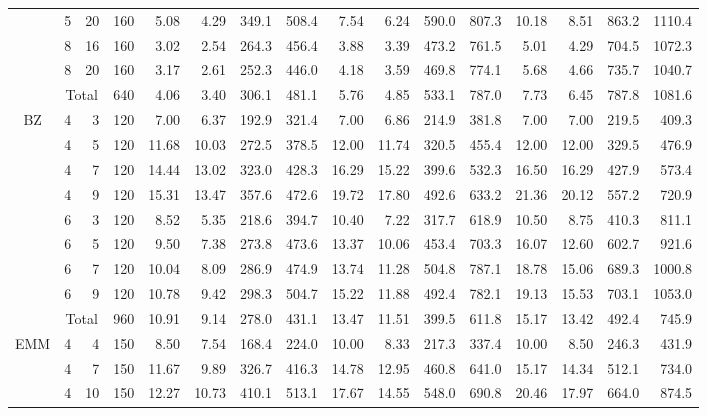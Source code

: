 \begin{table}[p]
{\begin{tabular}{@{} c r r r @{\hspace{\bbGroupSep}} *{4}{r} @{\hspace{\bbGroupSep}} *{4}{r} @{\hspace{\bbGroupSep}} *{4}{r} @{}}
     & 5 & 20 & 160 & 5.08 & 4.29 & 349.1 & 508.4 & 7.54 & 6.24 & 590.0 & 807.3 & 10.18 & 8.51 & 863.2 & 1110.4 \\
     & 8 & 16 & 160 & 3.02 & 2.54 & 264.3 & 456.4 & 3.88 & 3.39 & 473.2 & 761.5 & 5.01 & 4.29 & 704.5 & 1072.3 \\
     & 8 & 20 & 160 & 3.17 & 2.61 & 252.3 & 446.0 & 4.18 & 3.59 & 469.8 & 774.1 & 5.68 & 4.66 & 735.7 & 1040.7 \\
    \cmidrule{2-16}
     & \multicolumn{2}{c}{Total} & 640 & 4.06 & 3.40 & 306.1 & 481.1 & 5.76 & 4.85 & 533.1 & 787.0 & 7.73 & 6.45 & 787.8 & 1081.6 \\
    \cmidrule{1-16}
    \multirow{9}{*}{BZ} & 4 & 3 & 120 & 7.00 & 6.37 & 192.9 & 321.4 & 7.00 & 6.86 & 214.9 & 381.8 & 7.00 & 7.00 & 219.5 & 409.3 \\
     & 4 & 5 & 120 & 11.68 & 10.03 & 272.5 & 378.5 & 12.00 & 11.74 & 320.5 & 455.4 & 12.00 & 12.00 & 329.5 & 476.9 \\
     & 4 & 7 & 120 & 14.44 & 13.02 & 323.0 & 428.3 & 16.29 & 15.22 & 399.6 & 532.3 & 16.50 & 16.29 & 427.9 & 573.4 \\
     & 4 & 9 & 120 & 15.31 & 13.47 & 357.6 & 472.6 & 19.72 & 17.80 & 492.6 & 633.2 & 21.36 & 20.12 & 557.2 & 720.9 \\
     & 6 & 3 & 120 & 8.52 & 5.35 & 218.6 & 394.7 & 10.40 & 7.22 & 317.7 & 618.9 & 10.50 & 8.75 & 410.3 & 811.1 \\
     & 6 & 5 & 120 & 9.50 & 7.38 & 273.8 & 473.6 & 13.37 & 10.06 & 453.4 & 703.3 & 16.07 & 12.60 & 602.7 & 921.6 \\
     & 6 & 7 & 120 & 10.04 & 8.09 & 286.9 & 474.9 & 13.74 & 11.28 & 504.8 & 787.1 & 18.78 & 15.06 & 689.3 & 1000.8 \\
     & 6 & 9 & 120 & 10.78 & 9.42 & 298.3 & 504.7 & 15.22 & 11.88 & 492.4 & 782.1 & 19.13 & 15.53 & 703.1 & 1053.0 \\
    \cmidrule{2-16}
     & \multicolumn{2}{c}{Total} & 960 & 10.91 & 9.14 & 278.0 & 431.1 & 13.47 & 11.51 & 399.5 & 611.8 & 15.17 & 13.42 & 492.4 & 745.9 \\
    \cmidrule{1-16}
    \multirow{4}{*}{EMM} & 4 & 4 & 150 & 8.50 & 7.54 & 168.4 & 224.0 & 10.00 & 8.33 & 217.3 & 337.4 & 10.00 & 8.50 & 246.3 & 431.9 \\
     & 4 & 7 & 150 & 11.67 & 9.89 & 326.7 & 416.3 & 14.78 & 12.95 & 460.8 & 641.0 & 15.17 & 14.34 & 512.1 & 734.0 \\
     & 4 & 10 & 150 & 12.27 & 10.73 & 410.1 & 513.1 & 17.67 & 14.55 & 548.0 & 690.8 & 20.46 & 17.97 & 664.0 & 874.5 \\

\end{tabular}}
\end{table}
